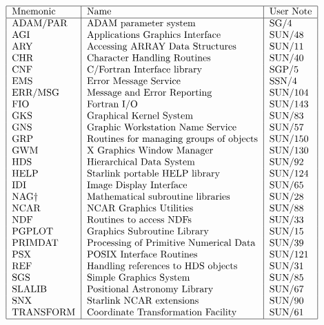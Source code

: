 \begin{table}[htb]\caption{Starlink libraries available on 
Unix}\label{libraries}
\[\begin{tabular}{|l|l|l|}
\hline
Mnemonic &Name &User Note\\
\hline
ADAM/PAR  & ADAM parameter system                  & SG/4    \\
AGI       & Applications Graphics Interface        & SUN/48  \\
ARY       & Accessing ARRAY Data Structures        & SUN/11  \\
CHR       & Character Handling Routines            & SUN/40  \\
CNF       & C/Fortran Interface library            & SGP/5   \\
EMS       & Error Message Service                  & SSN/4   \\
ERR/MSG   & Message and Error Reporting            & SUN/104 \\
FIO       & Fortran I/O                            & SUN/143 \\
GKS       & Graphical Kernel System                & SUN/83  \\
GNS       & Graphic Workstation Name Service       & SUN/57  \\
GRP       & Routines for managing groups of objects & SUN/150  \\
GWM       & X Graphics Window Manager              & SUN/130 \\
HDS       & Hierarchical Data System               & SUN/92  \\

HELP      & Starlink portable HELP library         & SUN/124 \\             
IDI       & Image Display Interface                & SUN/65  \\
NAG\dag   & Mathematical subroutine libraries      & SUN/28  \\
NCAR      & NCAR Graphics Utilities                 & SUN/88  \\
NDF       & Routines to access NDFs                & SUN/33  \\
PGPLOT    & Graphics Subroutine Library            & SUN/15  \\
PRIMDAT   & Processing of Primitive Numerical Data & SUN/39  \\
PSX       & POSIX Interface Routines               & SUN/121 \\
REF       & Handling references to HDS objects     & SUN/31  \\
SGS       & Simple Graphics System                 & SUN/85  \\
SLALIB    & Positional Astronomy Library           & SUN/67  \\
SNX       & Starlink NCAR extensions               & SUN/90 \\
TRANSFORM & Coordinate Transformation Facility     & SUN/61  \\
\hline
\end{tabular}\]
\end{table}

